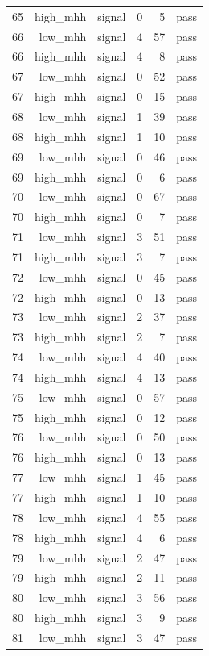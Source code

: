 \begin{table}[htbp]
{\begin{tabular}{lrrrrr}
65 & high\_mhh & signal & 0 & 5 & pass \\
66 & low\_mhh & signal & 4 & 57 & pass \\
66 & high\_mhh & signal & 4 & 8 & pass \\
67 & low\_mhh & signal & 0 & 52 & pass \\
67 & high\_mhh & signal & 0 & 15 & pass \\
68 & low\_mhh & signal & 1 & 39 & pass \\
68 & high\_mhh & signal & 1 & 10 & pass \\
69 & low\_mhh & signal & 0 & 46 & pass \\
69 & high\_mhh & signal & 0 & 6 & pass \\
70 & low\_mhh & signal & 0 & 67 & pass \\
70 & high\_mhh & signal & 0 & 7 & pass \\
71 & low\_mhh & signal & 3 & 51 & pass \\
71 & high\_mhh & signal & 3 & 7 & pass \\
72 & low\_mhh & signal & 0 & 45 & pass \\
72 & high\_mhh & signal & 0 & 13 & pass \\
73 & low\_mhh & signal & 2 & 37 & pass \\
73 & high\_mhh & signal & 2 & 7 & pass \\
74 & low\_mhh & signal & 4 & 40 & pass \\
74 & high\_mhh & signal & 4 & 13 & pass \\
75 & low\_mhh & signal & 0 & 57 & pass \\
75 & high\_mhh & signal & 0 & 12 & pass \\
76 & low\_mhh & signal & 0 & 50 & pass \\
76 & high\_mhh & signal & 0 & 13 & pass \\
77 & low\_mhh & signal & 1 & 45 & pass \\
77 & high\_mhh & signal & 1 & 10 & pass \\
78 & low\_mhh & signal & 4 & 55 & pass \\
78 & high\_mhh & signal & 4 & 6 & pass \\
79 & low\_mhh & signal & 2 & 47 & pass \\
79 & high\_mhh & signal & 2 & 11 & pass \\
80 & low\_mhh & signal & 3 & 56 & pass \\
80 & high\_mhh & signal & 3 & 9 & pass \\
81 & low\_mhh & signal & 3 & 47 & pass \\

\end{tabular}}
\end{table}
